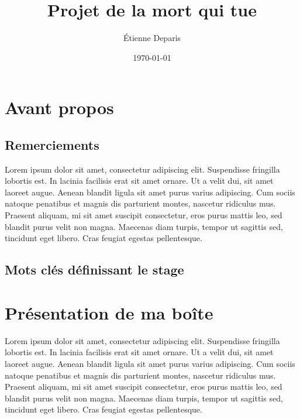 \documentclass[a4paper,12pt]{report}
\title{Projet de la mort qui tue}
\author{Étienne Deparis}
\date{\today}
\begin{document}
\renewcommand{\labelitemi}{\large\textcolor{tatoebagreen}{\fg}}
\stagepdtitre
\restoregeometry

\chapter{Avant propos}
\section{Remerciements}

Lorem ipsum dolor sit amet, consectetur adipiscing elit. Suspendisse
fringilla lobortis est. In lacinia facilisis erat sit amet ornare. Ut
a velit dui, sit amet laoreet augue. Aenean blandit ligula sit amet
purus varius adipiscing. Cum sociis natoque penatibus et magnis dis
parturient montes, nascetur ridiculus mus. Praesent aliquam, mi sit
amet suscipit consectetur, eros purus mattis leo, sed blandit purus
velit non magna. Maecenas diam turpis, tempor ut sagittis sed,
tincidunt eget libero. Cras feugiat egestas pellentesque.

\section{Mots clés définissant le stage}
\begin{center}
  \hspace{1mm}
  \hspace{1mm}
  \hspace{1mm}
  \vspace{2mm}

  \hspace{1mm}
  \hspace{1mm}
  \hspace{1mm}
\end{center}

\tableofcontents

\chapter{Présentation de ma boîte}
Lorem ipsum dolor sit amet, consectetur adipiscing elit. Suspendisse
fringilla lobortis est. In lacinia facilisis erat sit amet ornare. Ut
a velit dui, sit amet laoreet augue. Aenean blandit ligula sit amet
purus varius adipiscing. Cum sociis natoque penatibus et magnis dis
parturient montes, nascetur ridiculus mus. Praesent aliquam, mi sit
amet suscipit consectetur, eros purus mattis leo, sed blandit purus
velit non magna. Maecenas diam turpis, tempor ut sagittis sed,
tincidunt eget libero. Cras feugiat egestas pellentesque.
\end{document}
